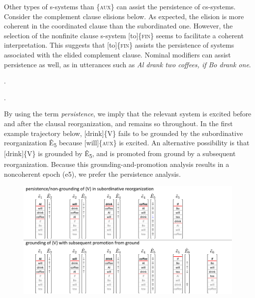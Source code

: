   Other types of s-systems than \{\textsc{aux}\} can assist the persistence of cs-systems. Consider the complement clause elisions below. As expected, the elision is more coherent in the coordinated clause than the subordinated one. However, the selection of the nonfinite clause s-system [to]\{\textsc{fin}\} seems to facilitate a coherent interpretation. This suggests that [to]\{\textsc{fin}\} assists the persistence of systems associated with the elided complement clause. Nominal modifiers can assist persistence as well, as in utterances such as \textit{Al drank two coffees, if Bo drank one}.

.
\z

.
\z

\z

  By using the term \textit{persistence}, we imply that the relevant system is excited before and after the clausal reorganization, and remains so throughout. In the first example trajectory below, [drink]\{V\} fails to be grounded by the subordinative reorganization Ê\textsubscript{5} because [will]\{\textsc{aux}\} is excited. An alternative possibility is that [drink]\{V\} is grounded by Ê\textsubscript{5},\textsubscript{} and is promoted from ground by a subsequent reorganization. Because this grounding-and-promotion analysis results in a noncoherent epoch (e5), we prefer the persistence analysis.

  
\begin{figure}
\includegraphics[width=\textwidth]{figures/Tilsen-img149.png}
\caption{\missingcaption}
\label{fig:}
\end{figure}
 


